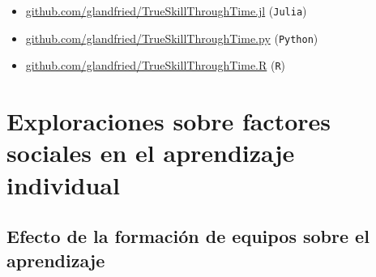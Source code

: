 \documentclass[a4paper,10pt]{book}
\theoremstyle{definition}
\newif\ifen
\newif\ifes
\newcommand{\en}[1]{\ifen#1\fi}
\newcommand{\es}[1]{\ifes#1\fi}
\begin{document}
\en{The source codes for the TrueSkill Through Time packages can be found at:}
\es{Los c\'odigos fuentes de los paquetes TrueSkill Through Time se encuentran en:}
\begin{itemize}
\item \href{github.com/glandfried/TrueSkillThroughTime.jl}{\url{github.com/glandfried/TrueSkillThroughTime.jl}} (\texttt{Julia})
\item \href{github.com/glandfried/TrueSkillThroughTime.py}{\url{github.com/glandfried/TrueSkillThroughTime.py}}  (\texttt{Python})
\item \href{github.com/glandfried/TrueSkillThroughTime.R}{\url{github.com/glandfried/TrueSkillThroughTime.R}}  (\texttt{R})
\end{itemize}





























\chapter{Exploraciones sobre factores sociales en el aprendizaje individual}


\section{Efecto de la formación de equipos sobre el aprendizaje} \label{ch:team}
\end{document}
